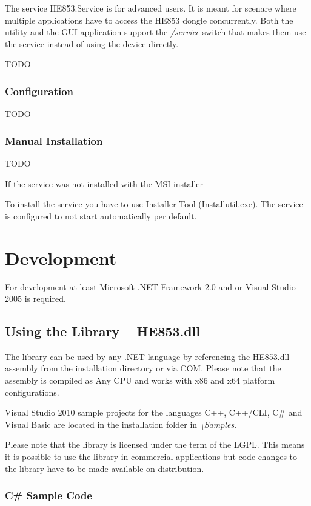 \documentclass[
a4paper,
oneside,
halfparskip*,
normalheadings,
]
{scrbook}
\begin{document}
The service HE853.Service is for advanced users. It is meant for scenare where multiple
applications have to access the HE853 dongle concurrently. Both the utility and the
GUI application support the \textit{/service} switch that makes them use the service
instead of using the device directly.

TODO

\subsection{Configuration}

TODO

\subsection{Manual Installation}

TODO

If the service was not installed with the MSI installer

To install the service you have to use Installer Tool (Installutil.exe). The service is
configured to not start automatically per default. 




\chapter{Development}

For development at least Microsoft .NET Framework 2.0 and or Visual Studio 2005 is required.

\section{Using the Library -- HE853.dll}

The library can be used by any .NET language by referencing the HE853.dll assembly from the
installation directory or via COM. Please note that the assembly is compiled as Any CPU
and works with x86 and x64 platform configurations.

Visual Studio 2010 sample projects for the languages C++, C++/CLI, C\# and Visual Basic
are located in the installation folder in \textit{\textbackslash Samples}.

Please note that the library is licensed under the term of the LGPL. This means it is
possible to use the library in commercial applications but code changes to the library
have to be made available on distribution.

\subsection{C\# Sample Code}
\end{document}
